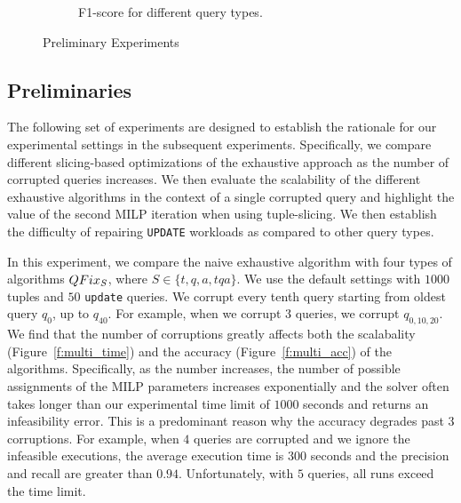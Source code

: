 \begin{figure}[h]
\begin{subfigure}[t]{.3\textwidth}
    \vspace*{-.1in}
    \caption{F1-score for different query types.}
    \label{f:indelup_acc} 
    \end{subfigure}
    \vspace*{-.1in}
    \caption{Preliminary Experiments}
  \end{figure}


\subsection{Preliminaries}
The following set of experiments are designed to establish the rationale for 
our experimental settings in the subsequent experiments.  
Specifically, we compare different slicing-based optimizations of the exhaustive approach
as the number of corrupted queries increases.  
We then evaluate the scalability of the different exhaustive algorithms in the context of a single
corrupted query and highlight the value of the second MILP iteration when using tuple-slicing.
We then establish the difficulty of repairing \texttt{UPDATE} workloads as compared to other query types.


In this experiment, we compare the naive exhaustive algorithm with four types of algorithms
$QFix_S$, where $S \in \{t, q, a, tqa\}$.  We use the default settings with $1000$ tuples and
$50$ \texttt{update} queries.  We corrupt every tenth query starting from oldest query $q_0$,
up to $q_{40}$.  For example, when we corrupt $3$ queries, we corrupt $q_{0,10,20}$.
We find that the number of corruptions greatly affects both the scalabality (Figure~\ref{f:multi_time}) 
and the accuracy (Figure~\ref{f:multi_acc}) of the algorithms.  Specifically, as the number increases,
the number of possible assignments of the MILP parameters increases exponentially and the solver often takes
longer than our experimental time limit of $1000$ seconds and returns an infeasibility error.  
This is a predominant reason why the accuracy degrades past $3$ corruptions.  For example, 
when $4$ queries are corrupted and we ignore the infeasible executions, the average execution time is $300$ seconds
and the precision and recall are greater than $0.94$.  Unfortunately, with $5$ queries, all runs exceed the time limit.


